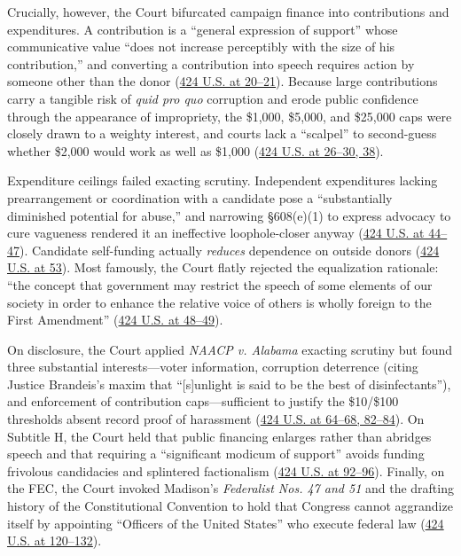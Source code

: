 \documentclass[12pt]{article}
\begin{document}
Crucially, however, the Court bifurcated campaign finance into contributions and expenditures. A contribution is a ``general expression of support'' whose communicative value ``does not increase perceptibly with the size of his contribution,'' and converting a contribution into speech requires action by someone other than the donor (\href{https://supreme.justia.com/cases/federal/us/424/1/}{424 U.S. at 20--21}). Because large contributions carry a tangible risk of \textit{quid pro quo} corruption and erode public confidence through the appearance of impropriety, the \$1,000, \$5,000, and \$25,000 caps were closely drawn to a weighty interest, and courts lack a ``scalpel'' to second-guess whether \$2,000 would work as well as \$1,000 (\href{https://supreme.justia.com/cases/federal/us/424/1/}{424 U.S. at 26--30, 38}).

Expenditure ceilings failed exacting scrutiny. Independent expenditures lacking prearrangement or coordination with a candidate pose a ``substantially diminished potential for abuse,'' and narrowing \S 608(e)(1) to express advocacy to cure vagueness rendered it an ineffective loophole-closer anyway (\href{https://supreme.justia.com/cases/federal/us/424/1/}{424 U.S. at 44--47}). Candidate self-funding actually \textit{reduces} dependence on outside donors (\href{https://supreme.justia.com/cases/federal/us/424/1/}{424 U.S. at 53}). Most famously, the Court flatly rejected the equalization rationale: ``the concept that government may restrict the speech of some elements of our society in order to enhance the relative voice of others is wholly foreign to the First Amendment'' (\href{https://supreme.justia.com/cases/federal/us/424/1/}{424 U.S. at 48--49}).

On disclosure, the Court applied \textit{NAACP v. Alabama} exacting scrutiny but found three substantial interests---voter information, corruption deterrence (citing Justice Brandeis's maxim that ``[s]unlight is said to be the best of disinfectants''), and enforcement of contribution caps---sufficient to justify the \$10/\$100 thresholds absent record proof of harassment (\href{https://supreme.justia.com/cases/federal/us/424/1/}{424 U.S. at 64--68, 82--84}). On Subtitle H, the Court held that public financing enlarges rather than abridges speech and that requiring a ``significant modicum of support'' avoids funding frivolous candidacies and splintered factionalism (\href{https://supreme.justia.com/cases/federal/us/424/1/}{424 U.S. at 92--96}). Finally, on the FEC, the Court invoked Madison's \textit{Federalist Nos. 47 and 51} and the drafting history of the Constitutional Convention to hold that Congress cannot aggrandize itself by appointing ``Officers of the United States'' who execute federal law (\href{https://supreme.justia.com/cases/federal/us/424/1/}{424 U.S. at 120--132}).
\end{document}
